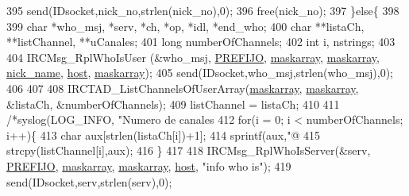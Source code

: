 \begin{DoxyCode}
{{{{395                                 send(IDsocket,nick\_no,strlen(nick\_no),0);
396                                 free(nick\_no);
397                         \}\textcolor{keywordflow}{else}\{
398 
399                                 \textcolor{keywordtype}{char} *who\_msj, *serv, *ch, *op, *idl, *end\_who;
400                                 \textcolor{keywordtype}{char} **listaCh, **listChannel, **uCanales;
401                                 \textcolor{keywordtype}{long} numberOfChannels;
402                                 \textcolor{keywordtype}{int} i, nstrings;
403 
404                                 IRCMsg\_RplWhoIsUser (&who\_msj, \hyperlink{_g-2361-06-_p1-_server_8h_a78c658ff923693099f7b621e7c351129}{PREFIJO}, 
      \hyperlink{_g-2361-06-_p1-_server_8c_ad51a4303b7c769561b12bf04a68bc042}{maskarray}, \hyperlink{_g-2361-06-_p1-_server_8c_ad51a4303b7c769561b12bf04a68bc042}{maskarray}, \hyperlink{_g-2361-06-_p1-_server_8c_aabbf66718cda228b924a4a9441eadf62}{nick\_name}, \hyperlink{_g-2361-06-_p1-_server_8c_a1c2046dcb30a629d6d9f45ff8f403f12}{host}, \hyperlink{_g-2361-06-_p1-_server_8c_ad51a4303b7c769561b12bf04a68bc042}{maskarray});
405                                 send(IDsocket,who\_msj,strlen(who\_msj),0);
406 
407 
408                                 IRCTAD\_ListChannelsOfUserArray(\hyperlink{_g-2361-06-_p1-_server_8c_ad51a4303b7c769561b12bf04a68bc042}{maskarray}, 
      \hyperlink{_g-2361-06-_p1-_server_8c_ad51a4303b7c769561b12bf04a68bc042}{maskarray}, &listaCh, &numberOfChannels);
409                                 listChannel = listaCh;
410 
411                                 \textcolor{comment}{/*syslog(LOG\_INFO, "Numero de canales %
412                                 \textcolor{keywordflow}{for}(i = 0; i < numberOfChannels; i++)\{
413                                         \textcolor{keywordtype}{char} aux[strlen(listaCh[i])+1];
414                                         sprintf(aux,\textcolor{stringliteral}{"@%
415                                         strcpy(listChannel[i],aux);
416                                 \}
417 
418                                 IRCMsg\_RplWhoIsServer(&serv, \hyperlink{_g-2361-06-_p1-_server_8h_a78c658ff923693099f7b621e7c351129}{PREFIJO}, 
      \hyperlink{_g-2361-06-_p1-_server_8c_ad51a4303b7c769561b12bf04a68bc042}{maskarray}, \hyperlink{_g-2361-06-_p1-_server_8c_ad51a4303b7c769561b12bf04a68bc042}{maskarray}, \hyperlink{_g-2361-06-_p1-_server_8c_a1c2046dcb30a629d6d9f45ff8f403f12}{host}, \textcolor{stringliteral}{"info who is"});
419                                 send(IDsocket,serv,strlen(serv),0);
}}}}}}
\end{DoxyCode}

